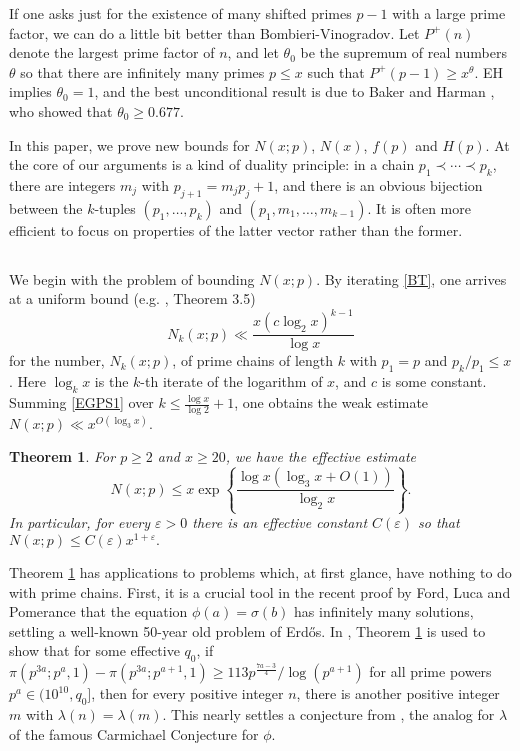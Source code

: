\documentclass[12pt]{amsart}
\theoremstyle{remark}
\theoremstyle{plain}
\newtheorem{thm}{Theorem}
\numberwithin{equation}{section}
\newcommand{\be}{\begin{equation}}
\newcommand{\ee}{\end{equation}}
\renewcommand{\th}{\ensuremath{\theta}}
\newcommand{\eps}{\ensuremath{\varepsilon}}
\renewcommand{\(}{\left(}
\renewcommand{\)}{\right)}
\renewcommand{\le}{\leqslant}
\renewcommand{\ge}{\geqslant}
\begin{document}
If one asks just for the existence of many shifted primes $p-1$ with a large
prime factor, we can do a little bit better than Bombieri-Vinogradov.
Let $P^+(n)$ denote the largest prime factor of $n$, and
let $\theta_0$ be the supremum of real numbers $\th$ so
 that there are infinitely many primes $p\le x$ such that $P^+(p-1) \ge x^\th$.
EH implies $\th_0=1$, and the best unconditional result is due to Baker and 
Harman \cite{BH}, who showed that $\theta_0 \ge 0.677$. 

In this paper, we prove new bounds for $N(x;p)$, $N(x)$, $f(p)$ and $H(p)$.
At the core of our arguments is a kind of duality principle: in a chain
$p_1 \prec \cdots \prec p_k$, there are integers $m_j$ with $p_{j+1}=m_jp_j+1$,
and there is an obvious bijection between the $k$-tuples $(p_1,\ldots,p_k)$ and
$(p_1,m_1,\ldots,m_{k-1})$.  It is often more efficient to focus on properties 
of the latter vector rather than the former.


\subsection{}
We begin with the problem of bounding $N(x;p)$.
By iterating \eqref{BT},
one arrives at a uniform bound (e.g. \cite{EGPS}, Theorem 3.5)
\be\label{EGPS1}
N_k(x;p) \ll \frac{x (c\log_2 x)^{k-1}}{\log x}
\ee
for the number, $N_k(x;p)$, of prime chains of length $k$ with $p_1=p$
 and $p_k/p_1\le x$. Here  $\log_k x$ is the $k$-th iterate 
of the logarithm of $x$, and $c$ is some constant.
 Summing \eqref{EGPS1} over $k\le \frac{\log x}{\log 2}+1$,
one obtains the weak estimate $N(x;p) \ll x^{O(\log_3 x)}.$


\begin{thm}\label{Pxp}
For $p\ge 2$ and $x\ge 20$, we have the effective estimate
$$
N(x;p) \le x \exp \left\{
 \frac{\log x (\log_3 x + O(1))} {\log_2 x} \right\}.
$$
In particular, for every $\eps>0$ there is an effective constant
$C(\eps)$ so that
$N(x;p) \le C(\eps) x^{1+\eps}.$
\end{thm}

Theorem \ref{Pxp} has applications to problems which, at first glance,
have nothing to do with prime chains.  First, it
is a crucial tool in the recent proof by Ford, Luca and Pomerance
\cite{phisig} that the equation $\phi(a)=\sigma(b)$ has infinitely
 many solutions,
settling a well-known 50-year old problem of Erd\H os.
In \cite{FL}, Theorem \ref{Pxp} is used to show that for some
 effective $q_0$,
if $\pi(p^{3a};p^a,1)-\pi(p^{3a};p^{a+1},1)\ge 113 
p^{\frac{7a-3}{4}}/\log (p^{a+1})$
for all prime powers $p^a\in (10^{10},q_0]$,
then for every positive integer $n$, 
there is another positive integer $m$ with
$\lambda(n)=\lambda(m)$.  This nearly settles a conjecture from \cite{BFLPS},
the analog for $\lambda$ of the famous Carmichael Conjecture for $\phi$.
\end{document}
